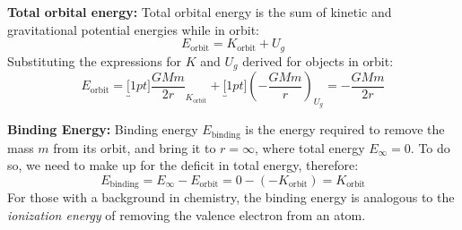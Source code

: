 \textbf{Total orbital energy:} Total orbital energy is the sum of kinetic and
gravitational potential energies while in orbit:
\begin{equation}
  E_\text{orbit}=K_\text{orbit}+U_g
\end{equation}
Substituting the expressions for $K$ and $U_g$ derived for objects in orbit:
\begin{equation}
  E_\text{orbit}=
  \underbracket[1pt]{\frac{GMm}{2r}}_{K_\text{orbit}} +
  \underbracket[1pt]{\left(-\frac{GMm}r\right)}_{U_g}=
  \boxed{-\frac{GMm}{2r}}
\end{equation}

%
%  
%  
%  
%
%
%
\textbf{Binding Energy:} Binding energy $E_\text{binding}$ is the energy
required to remove the mass $m$ from its orbit, and bring it to $r=\infty$,
where total energy $E_\infty=0$. To do so, we need to make up for the deficit
in total energy, therefore:
\begin{equation}
  E_\text{binding}=E_\infty-E_\text{orbit}=0-(-K_\text{orbit})=K_\text{orbit}
\end{equation}
For those with a background in chemistry, the binding energy is analogous to
the \emph{ionization energy} of removing the valence electron from an atom.



